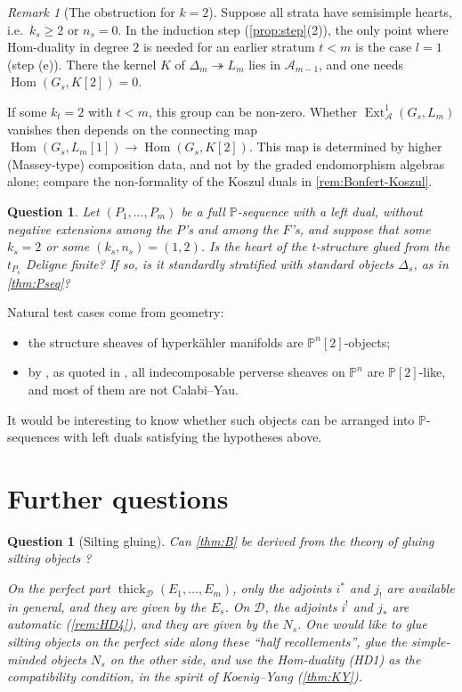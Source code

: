 \documentclass[11pt,reqno]{amsart}
\theoremstyle{plain}
\newtheorem{question}[theorem]{Question}
\theoremstyle{definition}
\theoremstyle{remark}
\newtheorem{remark}[theorem]{Remark}
\DeclareMathOperator{\Hom}{Hom}
\DeclareMathOperator{\Ext}{Ext}
\newcommand{\thick}[2][\cD]{\operatorname{thick}_{#1}(#2)}
\newcommand{\Pn}[2]{\mathbb{P}^{#1}[#2]}
\newcommand{\cD}{\mathcal{D}}
\newcommand{\cA}{\mathcal{A}}
\begin{document}
\begin{remark}[The obstruction for $k=2$]\label{rem:obstruction}
Suppose all strata have semisimple hearts, i.e.\ $k_s\ge2$ or $n_s=0$. In the induction step (\cref{prop:step}(2)), the only point where Hom-duality in degree $2$ is needed for an earlier stratum $t<m$ is the case $l=1$ (step (e)). There the kernel $K$ of $\Delta_m\twoheadrightarrow L_m$ lies in $\cA_{m-1}$, and one needs $\Hom(G_s,K[2])=0$.

If some $k_t=2$ with $t<m$, this group can be non-zero. Whether $\Ext^1_\cA(G_s,L_m)$ vanishes then depends on the connecting map $\Hom(G_s,L_m[1])\to\Hom(G_s,K[2])$. This map is determined by higher (Massey-type) composition data, and not by the graded endomorphism algebras alone; compare the non-formality of the Koszul duals in \cref{rem:Bonfert-Koszul}.
\end{remark}

\begin{question}\label{q:k2}
Let $(P_1,\dots,P_m)$ be a full $\mathbb{P}$-sequence with a left dual, without negative extensions among the $P$'s and among the $F$'s, and suppose that some $k_s=2$ or some $(k_s,n_s)=(1,2)$. Is the heart of the t-structure glued from the $t_{P_s}$ Deligne finite? If so, is it standardly stratified with standard objects $\Delta_s$, as in \cref{thm:Pseq}?
\end{question}

Natural test cases come from geometry:
\begin{itemize}
\item the structure sheaves of hyperk\"ahler manifolds are $\Pn n2$-objects;
\item by \cite[Thm.~B]{BC25}, as quoted in \cite{Bonf26}, all indecomposable perverse sheaves on $\mathbb{P}^n$ are $\mathbb{P}[2]$-like, and most of them are not Calabi--Yau.
\end{itemize}
It would be interesting to know whether such objects can be arranged into $\mathbb{P}$-sequences with left duals satisfying the hypotheses above.

\section{Further questions}\label{sec:questions}

\begin{question}[Silting gluing]\label{q:silting}
Can \cref{thm:B} be derived from the theory of gluing silting objects \cite{LVY14}?

On the perfect part $\thick{E_1,\dots,E_m}$, only the adjoints $i^*$ and $j_!$ are available in general, and they are given by the $E_s$. On $\cD$, the adjoints $i^!$ and $j_*$ are automatic (\cref{rem:HD4}), and they are given by the $N_s$. One would like to glue silting objects on the perfect side along these ``half recollements'', glue the simple-minded objects $N_s$ on the other side, and use the Hom-duality (HD1) as the compatibility condition, in the spirit of Koenig--Yang (\cref{thm:KY}).
\end{question}
\end{document}
